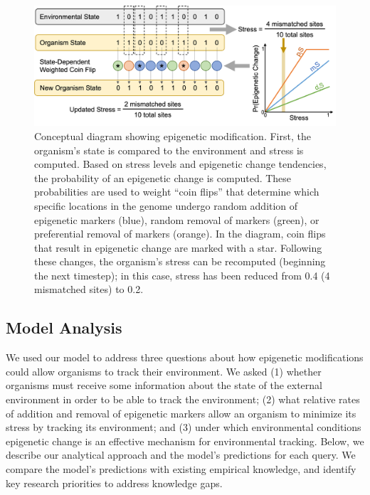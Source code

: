 \documentclass{article}
\begin{document}
\begin{figure}
    \centering
    \includegraphics[width=\textwidth]{Figures/ModelDiag_v1.png}
    \caption{Conceptual diagram showing epigenetic modification. First, the organism's state is compared to the environment and stress is computed. Based on stress levels and epigenetic change tendencies, the probability of an epigenetic change is computed. These probabilities are used to weight ``coin flips'' that determine which specific locations in the genome undergo random addition of epigenetic markers (blue), random removal of markers (green), or preferential removal of markers (orange). In the diagram, coin flips that result in epigenetic change are marked with a star. Following these changes, the organism's stress can be recomputed (beginning the next timestep); in this case, stress has been reduced from 0.4 (4 mismatched sites) to 0.2.}
    \label{fig:modeldiag}
\end{figure}

\subsection{Model Analysis}
We used our model to address three questions about how epigenetic modifications could allow organisms to track their environment. We asked (1) whether organisms must receive some information about the state of the external environment in order to be able to track the environment; (2) what relative rates of addition and removal of epigenetic markers allow an organism to minimize its stress by tracking its environment; and (3) under which environmental conditions epigenetic change is an effective mechanism for environmental tracking. Below, we describe our analytical approach and the model's predictions for each query. We compare the model's predictions with existing empirical knowledge, and identify key research priorities to address knowledge gaps.
\end{document}
